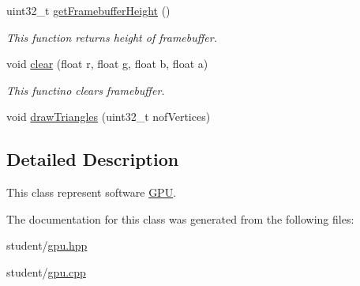 \begin{DoxyCompactItemize}
uint32\+\_\+t \hyperlink{group__framebuffer__tasks_gaa115f7153407b8020fd153b71abccf0e}{get\+Framebuffer\+Height} ()
\begin{DoxyCompactList}\small\item\em This function returns height of framebuffer. \end{DoxyCompactList}\item 
void \hyperlink{group__draw__tasks_ga012ff10197fb3e5051b854a0028db31d}{clear} (float r, float g, float b, float a)
\begin{DoxyCompactList}\small\item\em This functino clears framebuffer. \end{DoxyCompactList}\item 
void \hyperlink{group__draw__tasks_ga127436afbcbda852746dfb9dae885ecf}{draw\+Triangles} (uint32\+\_\+t nof\+Vertices)
\end{DoxyCompactItemize}


\subsection{Detailed Description}
This class represent software \hyperlink{classGPU}{G\+PU}. 

The documentation for this class was generated from the following files\+:\begin{DoxyCompactItemize}
\item 
student/\hyperlink{gpu_8hpp}{gpu.\+hpp}\item 
student/\hyperlink{gpu_8cpp}{gpu.\+cpp}\end{DoxyCompactItemize}
